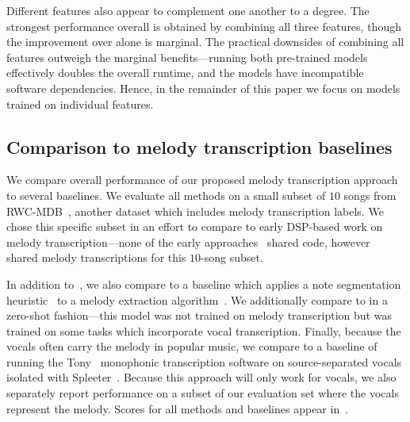 Different features also appear to complement one another to a degree. 
The strongest performance overall is obtained by combining all three features, though the improvement over \jukebox{} alone is marginal. 
The practical downsides of combining all features outweigh the marginal benefits---running both pre-trained models effectively doubles the overall runtime, and the models have incompatible software dependencies. 
Hence, in the remainder of this paper we focus on models trained on individual features.

\subsection{Comparison to melody transcription baselines}


We compare overall performance of our proposed melody transcription approach to several baselines. 
We evaluate all methods on a small subset of $10$ songs from RWC-MDB~\cite{goto2002rwc,goto2003rwc,goto2004development}, 
another dataset which includes melody transcription labels. 
We chose this specific subset in an effort to compare to early DSP-based work on melody transcription---none of the early approaches~\cite{paiva2004auditory,paiva2005detection,ryynanen2008automatic,weil2009automatic} shared code, however~\cite{ryynanen2008automatic} shared melody transcriptions for this $10$-song subset.

In addition to~\cite{ryynanen2008automatic}, we also compare to a baseline which applies a note segmentation heuristic~\cite{salamon2015midi} to a melody extraction algorithm~\cite{salamon2014melody}. 
We additionally compare to \mtthree{} in a zero-shot fashion---this model was not trained on melody transcription but was trained on some tasks which incorporate vocal transcription. 
Finally, because the vocals often carry the melody in popular music, we compare to a baseline of running the Tony~\cite{mauch2015computer} monophonic transcription software on source-separated vocals isolated with Spleeter~\cite{hennequin2020spleeter}. 
Because this approach will only work for vocals, we also separately report performance on a subset of our evaluation set where the vocals represent the melody. 
Scores for all methods and baselines appear in~. 

